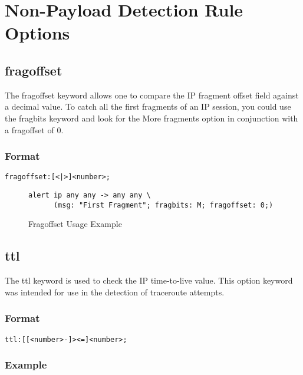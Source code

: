 \documentclass[english]{report}
\begin{document}
\section{Non-Payload Detection Rule Options}
\subsection{fragoffset \label{fragoffset section}}

The fragoffset keyword allows one to compare the IP fragment offset
field against a decimal value. To catch all the first fragments of
an IP session, you could use the fragbits keyword and look for the
More fragments option in conjunction with a fragoffset of 0.


\subsubsection{Format}

\begin{verbatim}
fragoffset:[<|>]<number>;
\end{verbatim}

\begin{figure}[!hbpt]
\begin{verbatim}
alert ip any any -> any any \
      (msg: "First Fragment"; fragbits: M; fragoffset: 0;)
\end{verbatim}
\caption{Fragoffset Usage Example \label{fragoffset usage example}}
\end{figure}


\subsection{ttl}

The ttl keyword is used to check the IP time-to-live value.  This option
keyword was intended for use in the detection of traceroute attempts.

\subsubsection{Format}

\begin{verbatim}
ttl:[[<number>-]><=]<number>;
\end{verbatim}

\subsubsection{Example}
\end{document}
